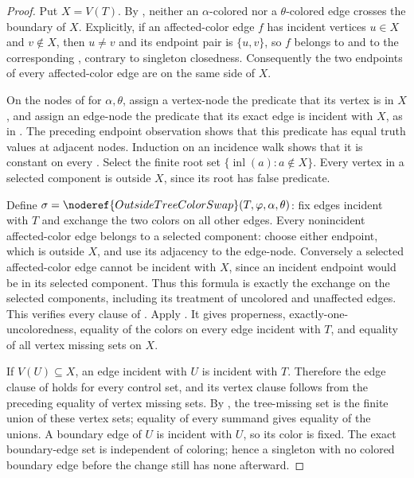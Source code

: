 \begin{proof}
Put $X=V(T)$. By , neither an $\alpha$-colored
nor a $\theta$-colored edge crosses the boundary of $X$. Explicitly, if
an affected-color edge $f$ has incident vertices $u\in X$ and $v\notin X$,
then $u\ne v$ and its endpoint pair is $\{u,v\}$, so $f$ belongs to
 and to the corresponding
, contrary to singleton closedness.
Consequently the two endpoints of every affected-color edge are on the
same side of $X$.

On the nodes of  for $\alpha,\theta$,
assign a vertex-node the predicate that its vertex is in $X$, and assign
an edge-node the predicate that its exact edge is incident with $X$,
as in . The preceding endpoint observation
shows that this predicate has equal truth values at adjacent nodes.
Induction on an incidence walk shows that it is constant on every
. Select the finite root set
$\{\operatorname{inl}(a):a\notin X\}$. Every vertex in a selected
component is outside $X$, since its root has false predicate.

Define $\sigma=\noderef{OutsideTreeColorSwap}(T,\varphi,\alpha,\theta)$:
fix edges incident with $T$ and exchange the two colors on all other
edges. Every nonincident affected-color edge belongs to a selected
component: choose either endpoint, which is outside $X$, and use its
adjacency to the edge-node. Conversely a selected affected-color edge
cannot be incident with $X$, since an incident endpoint would be in its
selected component. Thus this formula is exactly the exchange on the
selected components, including its treatment of uncolored and unaffected
edges. This verifies every clause of .
Apply . It gives properness,
exactly-one-uncoloredness, equality of the colors on every edge incident
with $T$, and equality of all vertex missing sets on $X$.

If $V(U)\subseteq X$, an edge incident with $U$ is incident with $T$.
Therefore the edge clause of  holds for every
control set, and its vertex clause follows from the preceding equality
of vertex missing sets. By , the tree-missing
set is the finite union of these vertex sets; equality of every summand
gives equality of the unions. A boundary edge of $U$ is incident with
$U$, so its color is fixed. The exact boundary-edge set is independent
of coloring; hence a singleton with no colored boundary edge before
the change still has none afterward.


\end{proof}
